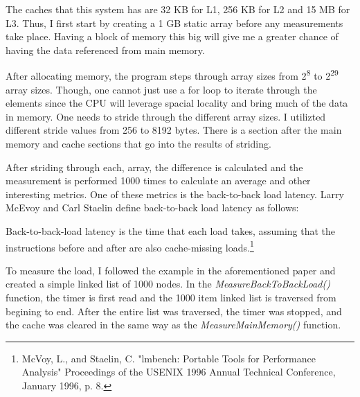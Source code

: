 \documentclass[paper=a4, fontsize=11pt]{scrartcl}
\numberwithin{equation}{section}        %
\numberwithin{figure}{section}          %
\numberwithin{table}{section}               %
\begin{document}
The caches that this system has are 32 KB for L1, 256 KB for L2 and 15 MB for L3.  Thus, I first start by creating a 1 GB static array before any measurements take place.  Having a block of memory this big will give me a greater chance of having the data referenced from main memory.



After allocating memory, the program steps through array sizes from 2\textsuperscript{8} to 2\textsuperscript{29} array sizes.  Though, one cannot just use a for loop to iterate through the elements since the CPU will leverage spacial locality and bring much of the data in memory.  One needs to stride through the different array sizes.  I utilizted different stride values from 256 to 8192 bytes.  There is a section after the main memory and cache sections that go into the results of striding.

After striding through each, array, the difference is calculated and the measurement is performed 1000 times to calculate an average and other interesting metrics.  One of these metrics is the back-to-back load latency.  Larry McEvoy and Carl Staelin define back-to-back load latency as follows:
\begin{addmargin}[1em]{2em}%
Back-to-back-load latency is the time that each load takes, assuming that the instructions before and after are also cache-missing loads.\footnote{McVoy, L., and Staelin, C.  "lmbench: Portable Tools for Performance Analysis" Proceedings of the USENIX 1996 Annual Technical Conference, January 1996, p. 8.}
\end{addmargin}

To measure the load, I followed the example in the aforementioned paper and created a simple linked list of 1000 nodes.  In the \textit{MeasureBackToBackLoad()} function, the timer is first read and the 1000 item linked list is traversed from begining to end.  After the entire list was traversed, the timer was stopped, and the cache was cleared in the same way as the \textit{MeasureMainMemory()} function.
\end{document}
